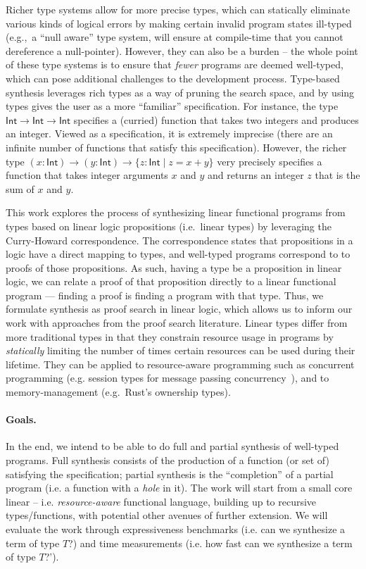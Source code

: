 \documentclass{llncs}
\newcommand{\mypara}[1]{\paragraph{\textbf{#1}.}}
\begin{document}
Richer type systems allow for more precise types, which can
statically eliminate various kinds of logical errors by making certain
invalid program states ill-typed (e.g.,~a ``null aware'' type system,
will ensure at compile-time that you cannot dereference a
null-pointer). However, they can also be a burden -- the whole point
of these type systems is to ensure that \emph{fewer} programs are
deemed well-typed, which can pose additional challenges to the
development process. Type-based synthesis leverages rich types as a
way of pruning the search space, and by using types gives the user as
a more ``familiar'' specification. For instance, the type
$\mathsf{Int} \rightarrow \mathsf{Int} \rightarrow \mathsf{Int}$
specifies a (curried) function that takes two integers and produces an
integer. Viewed as a specification, it is extremely imprecise (there
are an infinite number of functions that satisfy this specification).
However, the richer type $(x{:}\mathsf{Int}) \rightarrow
(y{:}\mathsf{Int}) \rightarrow \{z{:}\mathsf{Int} \mid z = x+y\}$
very precisely specifies a function that takes integer arguments $x$
and $y$ and returns an integer $z$ that is the sum of $x$ and $y$. 


%
This work explores the process of synthesizing linear functional
programs from types based on linear logic propositions (i.e.~linear
types) by leveraging the Curry-Howard correspondence.  The
correspondence states that propositions in a logic have a direct
mapping to types, and well-typed programs correspond to to proofs of
those propositions.  As such, having a type be a proposition in linear
logic, we can relate a proof of that proposition directly to a linear
functional program — finding a proof is finding a program with that
type. Thus, we formulate synthesis as proof search in linear logic,
which allows us to inform our work with approaches from the proof
search literature.  Linear types differ from more traditional types in
that they constrain resource usage in programs by \emph{statically}
limiting the number of times certain resources can be used during
their lifetime.  They can be applied to resource-aware programming
such as concurrent programming (e.g. session types for message passing
concurrency~\cite{}), and to memory-management (e.g.~Rust's ownership
types).

\mypara{Goals}
In the end, we intend to be able to do full and partial synthesis of
well-typed programs. Full synthesis consists of the production of a
function (or set of) satisfying the specification; partial synthesis
is the ``completion'' of a partial program (i.e. a function with a
\emph{hole} in it). The work will start from a small core linear --
i.e. \emph{resource-aware} functional language, building up to
recursive types/functions, with potential other avenues of further
extension. 
%
We will evaluate the work through
expressiveness benchmarks (i.e. can we synthesize a term of type $T$?) and time
measurements (i.e. how fast can we synthesize a term of type $T$?').
\end{document}
